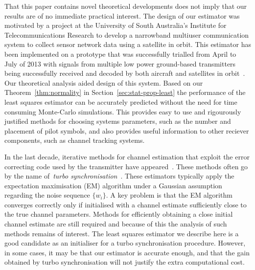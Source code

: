 \documentclass[journal]{IEEEtran}
\begin{document}
That this paper contains novel theoretical developments does not imply that our results are of no immediate practical interest.  The design of our estimator was motivated by a project at the University of South Australia's Institute for Telecommunications Research to develop a narrowband multiuser communication system to collect sensor network data using a satellite in orbit.  This estimator has been implemented on a prototype that was successfully trialled from April to July of 2013 with signals from multiple low power ground-based transmitters being successfully received and decoded by both aircraft and satellites in orbit~\cite{ASRPpromovideo}.  Our theoretical analysis aided design of this system.  Based on our Theorem~\ref{thm:normality} in Section~\ref{sec:stat-prop-least} the performance of the least squares estimator can be accurately predicted without the need for time consuming Monte-Carlo simulations.  This provides easy to use and rigourously justified methods for choosing systems parameters, such as the number and placement of pilot symbols, and also provides useful information to other reciever components, such as channel tracking systems.

In the last decade, iterative methods for channel estimation that exploit the error correcting code used by the transmitter have appeared~\cite{Lottici2004,Noels2005,Herzet_turbo_synch_proc_IEEE_2007,Herzet_framework_turbo_sync_2007}.  These methods often go by the name of~\emph{turbo synchronisation}~\cite{Herzet_turbo_synch_proc_IEEE_2007}.  
These estimators typically apply the expectation maximisation (EM) algorithm under a Gaussian assumption regarding the noise sequence $\{w_i\}$.  A key problem is that the EM algorithm converges correctly only if initialised with a channel estimate sufficiently close to the true channel parameters.  Methods for efficiently obtaining a close initial channel estimate are still required and because of this the analysis of such methods remains of interest.  The least squares estimator we describe here is a good candidate as an initialiser for a turbo synchronisation procedure.  However, in some cases, it may be that our estimator is accurate enough, and that the gain obtained by turbo synchronisation will not justify the extra computational cost.
\end{document}
